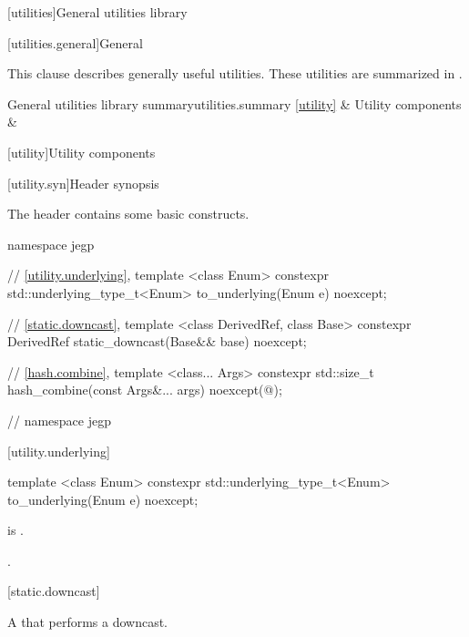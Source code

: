 [utilities]{General utilities library}

[utilities.general]{General}

\pnum
This clause describes generally useful utilities.
These utilities are summarized in .

\begin{libsumtab}{General utilities library summary}{utilities.summary}
\ref{utility}       & Utility components        &     \\
\end{libsumtab}

[utility]{Utility components}

[utility.syn]{Header  synopsis}

\pnum
The header 
contains some basic constructs.

%
\begin{codeblock}
namespace jegp
{
// \ref{utility.underlying}, 
template <class Enum>
constexpr std::underlying_type_t<Enum> to_underlying(Enum e) noexcept;

// \ref{static.downcast}, 
template <class DerivedRef, class Base>
constexpr DerivedRef static_downcast(Base&& base) noexcept;

// \ref{hash.combine}, 
template <class... Args>
constexpr std::size_t hash_combine(const Args&... args) noexcept(@\seebelow@);

} // namespace jegp
\end{codeblock}

[utility.underlying]{}

%
\begin{itemdecl}
template <class Enum>
constexpr std::underlying_type_t<Enum> to_underlying(Enum e) noexcept;
\end{itemdecl}

\begin{itemdescr}
\pnum
\constraints
{} is .

\pnum
\returns
{}.
\end{itemdescr}

[static.downcast]{}

\pnum
A  that performs a downcast.

